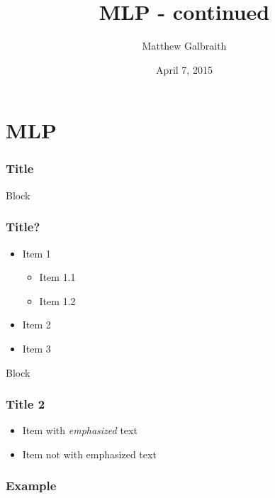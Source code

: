 \documentclass{beamer}
\title[MLP - continued]{MLP - continued}
\author{Matthew Galbraith}
\date{April 7, 2015}
\begin{document}
\begin{frame}
    \titlepage
\end{frame}

\section{MLP}
\begin{frame}
    \frametitle{Title}
    \begin{block}{Block}
    \end{block}
\end{frame}

\begin{frame}
    \frametitle{Title?}
    \begin{itemize}
        \item Item 1
        \begin{itemize}
            \item Item 1.1
            \item Item 1.2
        \end{itemize}
        \item Item 2
        \item Item 3
    \end{itemize}
    \begin{block}{Block}
    \end{block}
\end{frame}

\begin{frame}
    \frametitle{Title 2}
    \begin{itemize}
        \item Item with \emph{emphasized} text
        \item Item not with emphasized text
    \end{itemize}
\end{frame}

\begin{frame}
    \frametitle{Example}
\end{frame}

\begin{frame}
    \tableofcontents
\end{frame}
\end{document}
